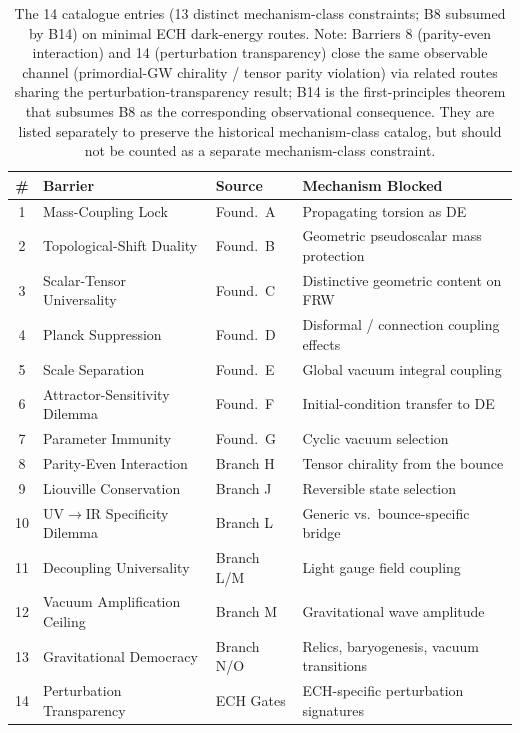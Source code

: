 \documentclass[aps,prd,twocolumn,superscriptaddress,showpacs,preprintnumbers,nofootinbib,longbibliography,floatfix]{revtex4-2}
\begin{document}
\begin{table}[tb]
\caption{\label{tab:barriers} The 14 catalogue entries (13 distinct mechanism-class constraints;
B8 subsumed by B14) on minimal ECH dark-energy routes. Note: Barriers 8 (parity-even
interaction) and 14 (perturbation transparency) close the same
observable channel (primordial-GW chirality / tensor parity violation)
via related routes sharing the perturbation-transparency result; B14 is the first-principles theorem that
subsumes B8 as the corresponding observational consequence. They are
listed separately to preserve the historical mechanism-class catalog,
but should not be counted as a separate mechanism-class constraint.}
\centering
\begin{tabular*}{\textwidth}{@{\extracolsep{\fill}}clll}
\toprule
\# & Barrier & Source & Mechanism Blocked \\
\midrule
1 & Mass-Coupling Lock & Found.\ A & Propagating torsion as DE \\
2 & Topological-Shift Duality & Found.\ B & Geometric pseudoscalar mass protection \\
3 & Scalar-Tensor Universality & Found.\ C & Distinctive geometric content on FRW \\
4 & Planck Suppression & Found.\ D & Disformal / connection coupling effects \\
5 & Scale Separation & Found.\ E & Global vacuum integral coupling \\
6 & Attractor-Sensitivity Dilemma & Found.\ F & Initial-condition transfer to DE \\
7 & Parameter Immunity & Found.\ G & Cyclic vacuum selection \\
8 & Parity-Even Interaction & Branch H & Tensor chirality from the bounce \\
9 & Liouville Conservation & Branch J & Reversible state selection \\
10 & UV$\to$IR Specificity Dilemma & Branch L & Generic vs.\ bounce-specific bridge \\
11 & Decoupling Universality & Branch L/M & Light gauge field coupling \\
12 & Vacuum Amplification Ceiling & Branch M & Gravitational wave amplitude \\
13 & Gravitational Democracy & Branch N/O & Relics, baryogenesis, vacuum transitions \\
14 & Perturbation Transparency & ECH Gates & ECH-specific perturbation signatures \\
\bottomrule
\end{tabular*}
\end{table}
\end{document}
